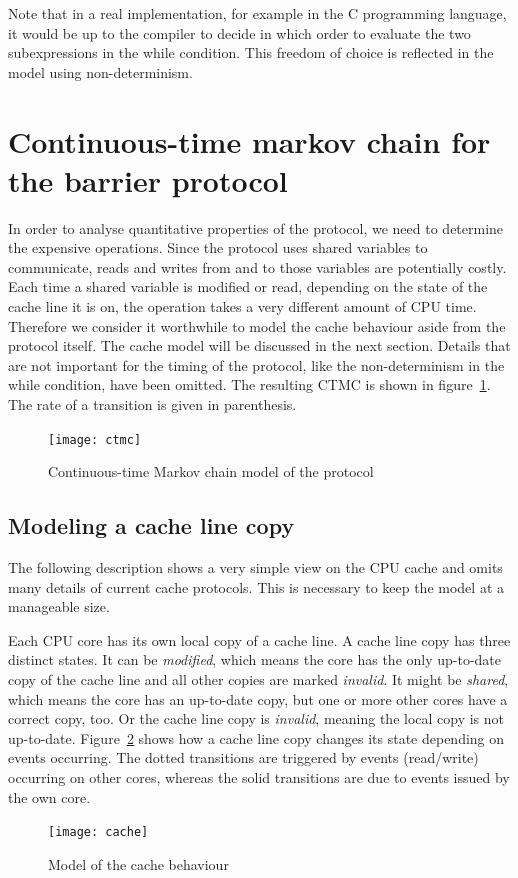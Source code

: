 \documentclass[a4paper, 10pt]{article}
\begin{document}
Note that in a real implementation, for example in the C programming language, it would be up to the compiler to decide in which order to evaluate the two subexpressions in the while condition. This freedom of choice is reflected in the model using non-determinism.

\clearpage

\section{Continuous-time markov chain for the barrier protocol}
In order to analyse quantitative properties of the protocol, we need to determine the expensive operations. Since the protocol uses shared variables to communicate, reads and writes from and to those variables are potentially costly. Each time a shared variable is modified or read, depending on the state of the cache line it is on, the operation takes a very different amount of CPU time. Therefore we consider it worthwhile to model the cache behaviour aside from the protocol itself. The cache model will be discussed in the next section. Details that are not important for the timing of the protocol, like the non-determinism in the while condition, have been omitted. The resulting CTMC is shown in figure~\ref{fig:ctmc}. The rate of a transition is given in parenthesis.
\begin{figure}[htbp]
	\centering
	\texttt{[image: ctmc]}
	\caption{Continuous-time Markov chain model of the protocol}
	\label{fig:ctmc}
\end{figure}
\clearpage
\subsection{Modeling a cache line copy}
The following description shows a very simple view on the CPU cache and omits many details of current cache protocols. This is necessary to keep the model at a manageable size.

Each CPU core has its own local copy of a cache line. A cache line copy has three distinct states. It can be \emph{modified}, which means the core has the only up-to-date copy of the cache line and all other copies are marked \emph{invalid}. It might be \emph{shared}, which means the core has an up-to-date copy, but one or more other cores have a correct copy, too. Or the cache line copy is \emph{invalid}, meaning the local copy is not up-to-date. Figure~\ref{fig:cache} shows how a cache line copy changes its state depending on events occurring. The dotted transitions are triggered by events (read/write) occurring on other cores, whereas the solid transitions are due to events issued by the own core.
\begin{figure}[htbp]
	\centering
	\texttt{[image: cache]}
	\caption{Model of the cache behaviour}
	\label{fig:cache}
\end{figure}
\end{document}
